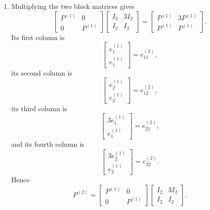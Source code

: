 \documentclass[12pt]{article}
\begin{document}
\begin{enumerate}[label=(\alph*)]
  \item Multiplying the two block matrices gives
  \[
  \begin{bmatrix}P^{(1)}&0\\0&P^{(1)}\end{bmatrix}
  \begin{bmatrix}I_2&3I_2\\I_2&I_2\end{bmatrix}
  =
  \begin{bmatrix}P^{(1)}&3P^{(1)}\\P^{(1)}&P^{(1)}\end{bmatrix}.
  \]
  Its first column is
  \[
  \begin{bmatrix}e_1^{(1)}\\e_1^{(1)}\end{bmatrix}=e_{11}^{(2)},
  \]
  its second column is
  \[
  \begin{bmatrix}e_2^{(1)}\\e_2^{(1)}\end{bmatrix}=e_{12}^{(2)},
  \]
  its third column is
  \[
  \begin{bmatrix}3e_1^{(1)}\\e_1^{(1)}\end{bmatrix}=e_{21}^{(2)},
  \]
  and its fourth column is
  \[
  \begin{bmatrix}3e_2^{(1)}\\e_2^{(1)}\end{bmatrix}=e_{22}^{(2)}.
  \]
  Hence
  \[
  \boxed{P^{(2)}=\begin{bmatrix}P^{(1)}&0\\0&P^{(1)}\end{bmatrix}
  \begin{bmatrix}I_2&3I_2\\I_2&I_2\end{bmatrix}.}
  \]


\end{enumerate}
\end{document}
